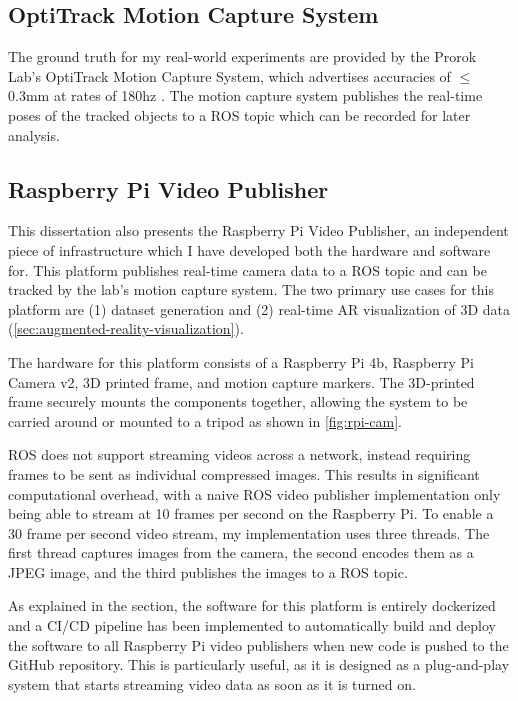 \subsection{OptiTrack Motion Capture System}
\label{sec:optitrack-motion-capture-system}
The ground truth for my real-world experiments are provided by the Prorok Lab's OptiTrack Motion Capture System, which advertises accuracies of $\leq$0.3mm at rates of 180hz \autocite{OptiTrackForRobotics}. The motion capture system publishes the real-time poses of the tracked objects to a ROS topic which can be recorded for later analysis.

\subsection{Raspberry Pi Video Publisher}
\label{sec:raspberry-pi-video-publisher}
This dissertation also presents the Raspberry Pi Video Publisher, an independent piece of infrastructure which I have developed both the hardware and software for. This platform publishes real-time camera data to a ROS topic and can be tracked by the lab's motion capture system. The two primary use cases for this platform are (1) dataset generation and (2) real-time AR visualization of 3D data (\autoref{sec:augmented-reality-visualization}).

The hardware for this platform consists of a Raspberry Pi 4b, Raspberry Pi Camera v2, 3D printed frame, and motion capture markers. The 3D-printed frame securely mounts the components together, allowing the system to be carried around or mounted to a tripod as shown in \autoref{fig:rpi-cam}.

ROS does not support streaming videos across a network, instead requiring frames to be sent as individual compressed images. This results in significant computational overhead, with a naive ROS video publisher implementation only being able to stream at 10 frames per second on the Raspberry Pi. To enable a 30 frame per second video stream, my implementation uses three threads. The first thread captures images from the camera, the second encodes them as a JPEG image, and the third publishes the images to a ROS topic.

As explained in the  section, the software for this platform is entirely dockerized and a CI/CD pipeline has been implemented to automatically build and deploy the software to all Raspberry Pi video publishers when new code is pushed to the GitHub repository. This is particularly useful, as it is designed as a plug-and-play system that starts streaming video data as soon as it is turned on.

